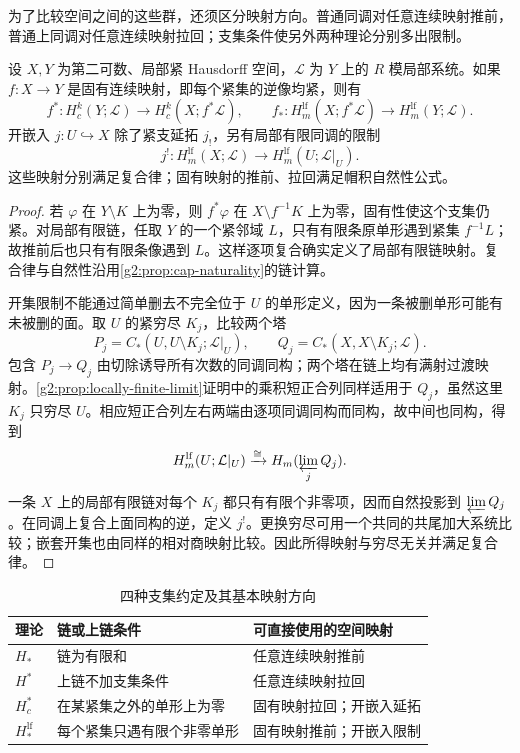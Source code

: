 为了比较空间之间的这些群，还须区分映射方向。普通同调对任意连续映射推前，普通上同调对任意连续映射拉回；支集条件使另外两种理论分别多出限制。

\begin{proposition}\label{g2:prop:support-functoriality}
	设 \(X,Y\) 为第二可数、局部紧 Hausdorff 空间，\(\mathcal L\) 为 \(Y\) 上的 \(R\) 模局部系统。如果 \(f:X\to Y\) 是固有连续映射，即每个紧集的逆像均紧，则有
	\[
		f^*:H_c^k(Y;\mathcal L)\longrightarrow H_c^k(X;f^*\mathcal L),
		\qquad
		f_*:H_m^{\mathrm{lf}}(X;f^*\mathcal L)\longrightarrow H_m^{\mathrm{lf}}(Y;\mathcal L).
	\]
	开嵌入 \(j:U\hookrightarrow X\) 除了紧支延拓 \(j_!\)，另有局部有限同调的限制
	\[
		j^!:H_m^{\mathrm{lf}}(X;\mathcal L)\longrightarrow H_m^{\mathrm{lf}}(U;\mathcal L|_U).
	\]
	这些映射分别满足复合律；固有映射的推前、拉回满足帽积自然性公式。
\end{proposition}
\begin{proof}
	若 \(\varphi\) 在 \(Y\setminus K\) 上为零，则 \(f^*\varphi\) 在 \(X\setminus f^{-1}K\) 上为零，固有性使这个支集仍紧。对局部有限链，任取 \(Y\) 的一个紧邻域 \(L\)，只有有限条原单形遇到紧集 \(f^{-1}L\)；故推前后也只有有限条像遇到 \(L\)。这样逐项复合确实定义了局部有限链映射。复合律与自然性沿用\cref{g2:prop:cap-naturality}的链计算。

	开集限制不能通过简单删去不完全位于 \(U\) 的单形定义，因为一条被删单形可能有未被删的面。取 \(U\) 的紧穷尽 \(K_j\)，比较两个塔
	\[
		P_j=C_*(U,U\setminus K_j;\mathcal L|_U),
		\qquad Q_j=C_*(X,X\setminus K_j;\mathcal L).
	\]
	包含 \(P_j\to Q_j\) 由切除诱导所有次数的同调同构；两个塔在链上均有满射过渡映射。\cref{g2:prop:locally-finite-limit}证明中的乘积短正合列同样适用于 \(Q_j\)，虽然这里 \(K_j\) 只穷尽 \(U\)。相应短正合列左右两端由逐项同调同构而同构，故中间也同构，得到
	\[
		H_m^{\mathrm{lf}}(U;\mathcal L|_U)
		\xrightarrow{\cong}H_m(\varprojlim_j Q_j).
	\]
	一条 \(X\) 上的局部有限链对每个 \(K_j\) 都只有有限个非零项，因而自然投影到 \(\varprojlim Q_j\)。在同调上复合上面同构的逆，定义 \(j^!\)。更换穷尽可用一个共同的共尾加大系统比较；嵌套开集也由同样的相对商映射比较。因此所得映射与穷尽无关并满足复合律。
\end{proof}

\begin{table}[htbp]
	\centering
	\caption{四种支集约定及其基本映射方向}
	\label{g2:tab:support-functors}
	\begin{tabularx}{\textwidth}{@{}lXX@{}}
		\toprule
		理论 & 链或上链条件 & 可直接使用的空间映射 \\
		\midrule
		\(H_*\) & 链为有限和 & 任意连续映射推前 \\
		\(H^*\) & 上链不加支集条件 & 任意连续映射拉回 \\
		\(H_c^*\) & 在某紧集之外的单形上为零 & 固有映射拉回；开嵌入延拓 \\
		\(H_*^{\mathrm{lf}}\) & 每个紧集只遇有限个非零单形 & 固有映射推前；开嵌入限制 \\
		\bottomrule
	\end{tabularx}
\end{table}

